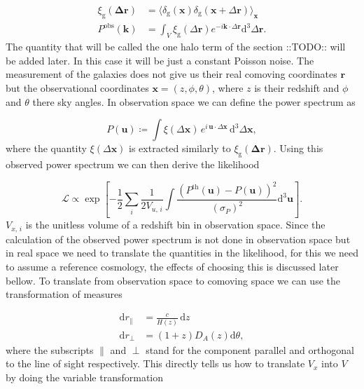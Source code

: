 \documentclass[oneside]{book}
\newcommand*{\rd}{\mathrm{d}}
\newcommand*{\marktodo}{{\color{mmcol} ::TODO::}\xspace}
\begin{document}
\begin{align}
    \xi_\mathrm{g}(\boldsymbol{\Delta r}) &= \langle \delta_\mathrm{g}(\boldsymbol{x}) \delta_\mathrm{g}(\boldsymbol{x}+\Delta \boldsymbol{r}) \rangle_{\boldsymbol{x}}\\
    P^\mathrm{obs}(\boldsymbol{k}) &= \int_V \xi_\mathrm{g}(\Delta \boldsymbol{r}) e^{-i \boldsymbol{k}\cdot \Delta \boldsymbol{r}} \rd^3 \Delta\boldsymbol{r}.
\end{align}
The quantity that will be called the one halo term of the section \marktodo will be added later. In this case it will be just a constant Poisson noise.
The measurement of the galaxies does not give us their real comoving coordinates $\boldsymbol{r}$ but the observational coordinates $\boldsymbol{x}=(z,\phi,\theta)$, where $z$ is their redshift and $\phi$ and $\theta$ there sky angles. In observation space we can define the power spectrum as 

\begin{equation}
    P(\boldsymbol{u}) \coloneq \int \xi(\Delta \boldsymbol{x}) \, e^{i \, \boldsymbol{u}\cdot \Delta\boldsymbol{x}} \,\rd^3 \Delta\boldsymbol{x},
 \end{equation} 
where the quantity $\xi(\Delta \boldsymbol{x})$ is extracted similarly to $\xi_\mathrm{g}(\boldsymbol{\Delta r}) $. Using this observed power spectrum we can then derive the likelihood 

 \begin{equation}
    \mathcal{L} \propto \exp\left[-\frac{1}{2} \sum_i \frac{1}{2 V_{u,\,i}} \int \frac{\left(P^\mathrm{th}(\boldsymbol{u})-P(\boldsymbol{u})\right)^2}{\left(\sigma_{P}\right)^2} \rd^3 \boldsymbol{u} \right].
 \end{equation}
$V_{x,\,i}$ is the unitless volume of a redshift bin in observation space. Since the calculation of the observed power spectrum is not done in observation space but in real space we need to translate the quantities in the likelihood, for this we need to assume a reference cosmology, the effects of choosing this is discussed later bellow. To translate from observation space to comoving space we can use the transformation of measures

\begin{align}
    \rd r_{\|} &= \frac{c}{H(z)}\, \rd z     \nonumber\\
    \rd r_\perp &= \left( 1+ z \right) D_A(z) \rd \theta,     \label{eq:transformation_orth}
\end{align} 
where the subscripts $\|$ and $\perp$ stand for the component parallel and orthogonal to the line of sight respectively. This directly tells us how to translate $V_x$ into $V$ by doing the variable transformation 
\end{document}
